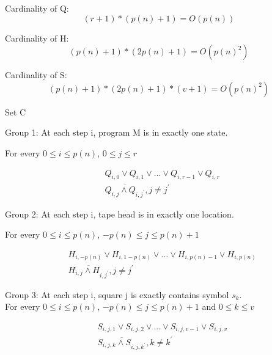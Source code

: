 \documentclass[12pt,a4paper]{report}
\begin{document}
Cardinality of Q: 
\begin{equation*}
(r+1) * (p(n) + 1) = O(p(n))
\end{equation*}

Cardinality of H: 
\begin{equation*}
(p(n)+1) * (2p(n)+1) = O(p(n)^{2})
\end{equation*}

Cardinality of S: 
\begin{equation*}
(p(n)+1) * (2p(n)+1) * (v+1) = O(p(n)^{2})
\end{equation*}

\begin{center}
Set C
\end{center}

Group 1: At each step i, program M is in exactly one state.

For every $0 \le i \le p(n)$, $0 \le j \le r$

\begin{equation*}
\begin{split}
&Q_{i,0} \vee Q_{i,1} \vee ... \vee Q_{i,r-1} \vee Q_{i,r} \\
&\overline{Q_{i,j} \wedge Q_{i,j^{'}}}  , j \ne j^{'}
\end{split}
\end{equation*}

Group 2: At each step i, tape head is in exactly one location.

For every $0 \le i \le p(n)$, $-p(n) \le j \le p(n)+1$

\begin{equation*}
\begin{split}
&H_{i,-p(n)} \vee H_{i,1-p(n)} \vee ... \vee H_{i, p(n)-1} \vee H_{i,p(n)} \\
&\overline{H_{i,j} \wedge H_{i,j^{'}}}  , j \ne j^{'}
\end{split}
\end{equation*}

Group 3: At each step i, square j is exactly contains symbol $s_{k}$. \\
For every $0 \le i \le p(n)$, $-p(n) \le j \le p(n)+1$ and $0 \le k \le v$

\begin{equation*}
\begin{split}
&S_{i,j,1} \vee S_{i,j,2} \vee ... \vee S_{i,j,v-1} \vee S_{i,j,v} \\
&\overline{S_{i,j,k} \wedge S_{i,j,k^{'}}}  , k \ne k^{'}
\end{split}
\end{equation*}
\end{document}
